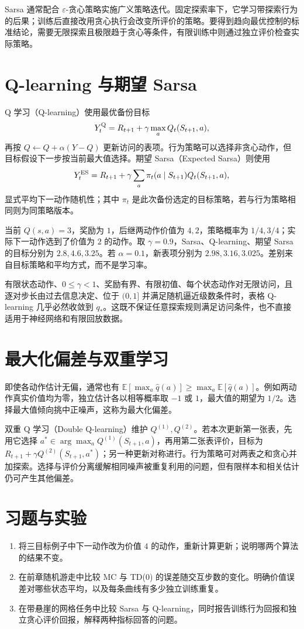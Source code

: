 Sarsa 通常配合 $\varepsilon$-贪心策略实施广义策略迭代。固定探索率下，它学习带探索行为的后果；训练后直接改用贪心执行会改变所评价的策略。要得到趋向最优控制的标准结论，需要无限探索且极限趋于贪心等条件，有限训练中则通过独立评价检查实际策略。

\section{Q-learning 与期望 Sarsa}

Q 学习（Q-learning）使用最优备份目标
\[
Y_t^{\rm Q}=R_{t+1}+\gamma\max_aQ_t(S_{t+1},a),
\]
再按 $Q\leftarrow Q+\alpha(Y-Q)$ 更新访问的表项。行为策略可以选择非贪心动作，但目标假设下一步按当前最大值选择。期望 Sarsa（Expected Sarsa）则使用
\[
Y_t^{\rm ES}=R_{t+1}+\gamma\sum_a\pi_t(a\mid S_{t+1})Q_t(S_{t+1},a),
\]
显式平均下一动作随机性；其中 $\pi_t$ 是此次备份选定的目标策略，若与行为策略相同则为同策略版本。

\begin{example}
当前 $Q(s,a)=3$，奖励为 $1$，后继两动作价值为 $4,2$，策略概率为 $1/4,3/4$；实际下一动作选到了价值为 $2$ 的动作。取 $\gamma=0.9$，Sarsa、Q-learning、期望 Sarsa 的目标分别为 $2.8,4.6,3.25$。若 $\alpha=0.1$，新表项分别为 $2.98,3.16,3.025$。差别来自目标策略和平均方式，而不是学习率。
\end{example}

有限状态动作、$0\leq\gamma<1$、奖励有界、有限初值、每个状态动作对无限访问，且逐对步长由过去信息决定、位于 $(0,1]$ 并满足随机逼近级数条件时，表格 Q-learning 几乎必然收敛到 $q_*$\cite{watkins-qlearning}。这既不保证任意探索规则满足访问条件，也不直接适用于神经网络和有限回放数据。

\section{最大化偏差与双重学习}

即使各动作估计无偏，通常也有 $\mathbb E[\max_a\widehat q(a)]\geq\max_a\mathbb E[\widehat q(a)]$。例如两动作真实价值均为零，独立估计各以相等概率取 $-1$ 或 $1$，最大值的期望为 $1/2$。选择最大值倾向挑中正噪声，这称为最大化偏差。

双重 Q 学习（Double Q-learning）维护 $Q^{(1)},Q^{(2)}$。若本次更新第一张表，先用它选择 $a^*\in\arg\max_aQ^{(1)}(S_{t+1},a)$，再用第二张表评价，目标为 $R_{t+1}+\gamma Q^{(2)}(S_{t+1},a^*)$；另一种更新对称进行。行为策略可对两表之和贪心并加探索。选择与评价分离缓解相同噪声被重复利用的问题，但有限样本和相关估计仍可产生其他偏差。

\section{习题与实验}
\begin{enumerate}
\item 将三目标例子中下一动作改为价值 $4$ 的动作，重新计算更新；说明哪两个算法的结果不变。
\item 在前章随机游走中比较 MC 与 TD(0) 的误差随交互步数的变化。明确价值误差对哪些状态平均，以及每条曲线有多少独立训练重复。
\item 在带悬崖的网格任务中比较 Sarsa 与 Q-learning，同时报告训练行为回报和独立贪心评价回报，解释两种指标回答的问题。
\end{enumerate}





